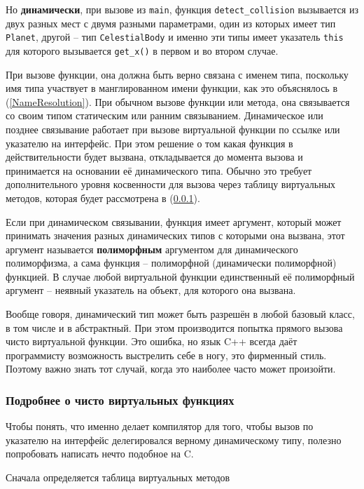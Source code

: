 \documentclass[a4paper,12pt,oneside]{article}
\begin{document}
Но \textbf{динамически}, при вызове из \lstinline!main!, функция \lstinline!detect_collision! вызывается из двух разных мест с двумя разными параметрами, один из которых имеет тип \lstinline!Planet!, другой – тип \lstinline!CelestialBody! и именно эти типы имеет указатель \lstinline!this! для которого вызывается \lstinline!get_x()! в первом и во втором случае.

При вызове функции, она должна быть верно связана с именем типа, поскольку имя типа участвует в манглированном имени функции, как это объяснялось в (\ref{NameResolution}). При обычном вызове функции или метода, она связывается со своим типом статическим или ранним связыванием. Динамическое или позднее связывание работает при вызове виртуальной функции по ссылке или указателю на интерфейс. При этом решение о том какая функция в действительности будет вызвана, откладывается до момента вызова и принимается на основании её динамического типа. Обычно это требует дополнительного уровня косвенности для вызова через таблицу виртуальных методов, которая будет рассмотрена в (\ref{VirtualUnderHood}).

Если при динамическом связывании, функция имеет аргумент, который может принимать значения разных динамических типов с которыми она вызвана, этот аргумент называется \textbf{полиморфным} аргументом для динамического полиморфизма, а сама функция -- полиморфной (динамически полиморфной) функцией. В случае любой виртуальной функции единственный её полиморфный аргумент -- неявный указатель на объект, для которого она вызвана.

Вообще говоря, динамический тип может быть разрешён в любой базовый класс, в том числе и в абстрактный. При этом производится попытка прямого вызова чисто виртуальной функции. Это ошибка, но язык C++ всегда даёт программисту возможность выстрелить себе в ногу, это фирменный стиль. Поэтому важно знать тот случай, когда это наиболее часто может произойти.

\subsubsection{Подробнее о чисто виртуальных функциях}\label{VirtualUnderHood}

Чтобы понять, что именно делает компилятор для того, чтобы вызов по указателю на интерфейс делегировался верному динамическому типу, полезно попробовать написать нечто подобное на C.

Сначала определяется таблица виртуальных методов
\end{document}
